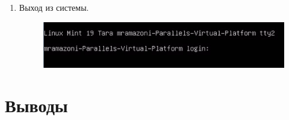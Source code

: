 \begin{enumerate}
\begin{figure}[h]
		\centering
	\end{figure}
	\item Выход из системы.
	\begin{figure}[h]
		\includegraphics{lab1_1.png}
		\centering
	\end{figure}
\end{enumerate}

\section{Выводы}

